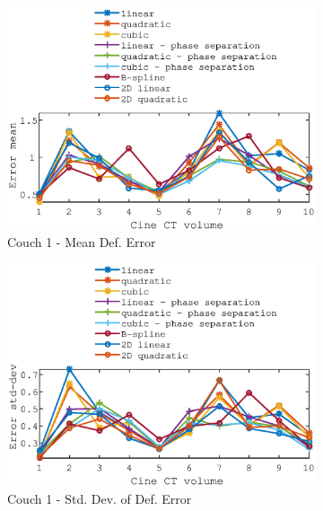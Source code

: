 \documentclass[11pt,a4paper,oneside]{report}
\begin{document}
\begin{figure}
  \hspace*{-2em}
  \begin{subfigure}[b]{0.5\textwidth}
    \includegraphics[width=\textwidth, trim=0 0 0 \trimval,clip=true]{figures/task4/def_mean_error_couch1.eps}
    \caption{Couch 1 - Mean Def. Error}
  \end{subfigure}%
  \begin{subfigure}[b]{0.5\textwidth}
    \includegraphics[width=\textwidth, trim=0 0 0 \trimval,clip=true]{figures/task4/def_stddev_error_couch1.eps}
    \caption{Couch 1 - Std. Dev. of Def. Error}
  \end{subfigure}
  ~
    \hspace*{-2em}
  \begin{subfigure}[b]{0.5\textwidth}

\end{subfigure}
\end{figure}
\end{document}
